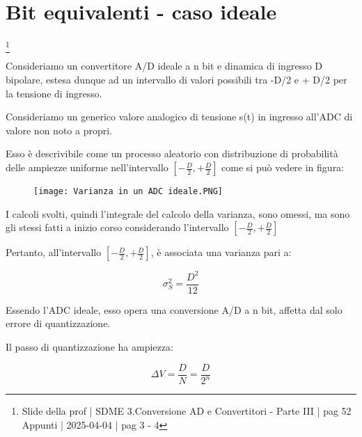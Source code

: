 \newpage 

\section{Bit equivalenti - caso ideale}
\footnote{Slide della prof | SDME 3.Conversione AD e Convertitori - Parte III | pag 52 \\  
Appunti | 2025-04-04 | pag 3 - 4}

Consideriamo un convertitore A/D ideale a n bit e dinamica di ingresso D bipolare, estesa dunque ad un intervallo di valori possibili tra -D/2 e + D/2 per la tensione di ingresso. \newline 

Consideriamo un generico valore analogico di tensione s(t) in ingresso all'ADC di valore non noto a propri. \newline 

Esso è descrivibile come un processo aleatorio con distribuzione di probabilità delle ampiezze uniforme 
nell'intervallo $\left[ - \frac{D}{2}, + \frac{D}{2}\right]$ come si può vedere in figura: 

\begin{figure}[h]
    \centering
    \texttt{[image: Varianza in un ADC ideale.PNG]}
\end{figure}

\begin{tcolorbox}
    I calcoli svolti, quindi l'integrale del calcolo della varianza, sono omessi, ma sono gli stessi fatti a inizio corso considerando l'intervallo $\left[ - \frac{D}{2}, + \frac{D}{2}\right]$
\end{tcolorbox}

Pertanto, all'intervallo $\left[ - \frac{D}{2}, + \frac{D}{2}\right]$, è associata una varianza pari a: 

{
    \Large 
    \begin{equation}
        \sigma_S ^{2} = \frac{D^{2}}{12}
    \end{equation}
}

Essendo l'ADC ideale, esso opera una conversione A/D a n bit, affetta dal solo errore di quantizzazione. \newline 

Il passo di quantizzazione ha ampiezza: 

{
    \Large 
    \begin{equation}
        \Delta V = \frac{D}{N} = \frac{D}{2^{n}}
    \end{equation}
}

